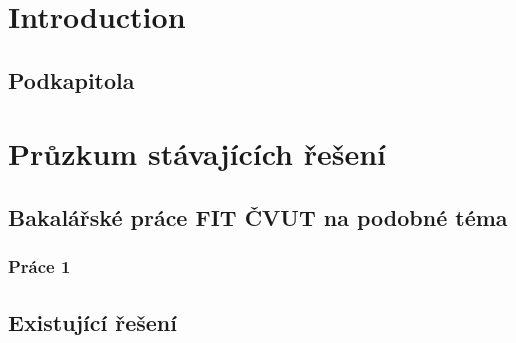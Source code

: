 \chapter*{Introduction}
\setcounter{page}{1}



\section{Podkapitola}


\chapter{Průzkum stávajících řešení}

\section{Bakalářské práce FIT ČVUT na podobné téma}

\subsection{Práce 1}

\section{Existující řešení}

